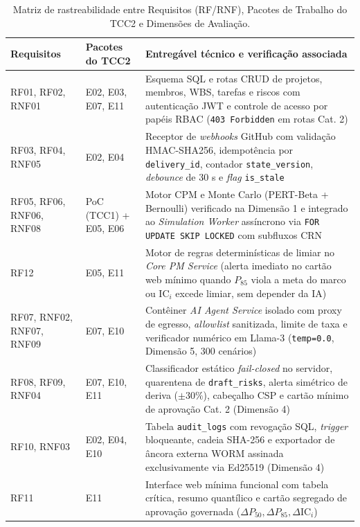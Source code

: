 \documentclass[12pt,openany,oneside,a4paper,english,brazilian,sumario=tradicional]{abntex2}
\newcommand{\fonteautores}{\par\vspace{1mm}{\small Fonte: Elaborado pelos autores (2026).}}
\newcommand{\IC}{\mathrm{IC}}
\begin{document}
\begin{table}[htbp]
\caption{Matriz de rastreabilidade entre Requisitos (RF/RNF), Pacotes de Trabalho do TCC2 e Dimensões de Avaliação.}\label{tab:rastreabilidade}
\footnotesize
\begin{tabularx}{\textwidth}{L{2.3cm} L{2.4cm} Y}
\toprule
\textbf{Requisitos} & \textbf{Pacotes do TCC2} & \textbf{Entregável técnico e verificação associada}\\
\midrule
RF01, RF02, RNF01 & E02, E03, E07, E11 & Esquema SQL e rotas CRUD de projetos, membros, WBS, tarefas e riscos com autenticação JWT e controle de acesso por papéis RBAC (\texttt{403 Forbidden} em rotas Cat. 2)\\
RF03, RF04, RNF05 & E02, E04 & Receptor de \textit{webhooks} GitHub com validação HMAC-SHA256, idempotência por \texttt{delivery\_\allowbreak id}, contador \texttt{state\_\allowbreak version}, \textit{debounce} de 30 s e \textit{flag} \texttt{is\_\allowbreak stale}\\
RF05, RF06, RNF06, RNF08 & PoC (TCC1) + E05, E06 & Motor CPM e Monte Carlo (PERT-Beta + Bernoulli) verificado na Dimensão 1 e integrado ao \textit{Simulation Worker} assíncrono via \texttt{FOR UPDATE SKIP LOCKED} com subfluxos CRN\\
RF12 & E05, E11 & Motor de regras determinísticas de limiar no \textit{Core PM Service} (alerta imediato no cartão web mínimo quando $P_{85}$ viola a meta do marco ou $\IC_i$ excede limiar, sem depender da IA)\\
RF07, RNF02, RNF07, RNF09 & E07, E10 & Contêiner \textit{AI Agent Service} isolado com proxy de egresso, \textit{allowlist} sanitizada, limite de taxa e verificador numérico em Llama-3 (\texttt{temp=0.0}, Dimensão 5, 300 cenários)\\
RF08, RF09, RNF04 & E07, E10, E11 & Classificador estático \textit{fail-closed} no servidor, quarentena de \texttt{draft\_\allowbreak risks}, alerta simétrico de deriva ($\pm 30\%$), cabeçalho CSP e cartão mínimo de aprovação Cat. 2 (Dimensão 4)\\
RF10, RNF03 & E02, E04, E10 & Tabela \texttt{audit\_\allowbreak logs} com revogação SQL, \textit{trigger} bloqueante, cadeia SHA-256 e exportador de âncora externa WORM assinada exclusivamente via Ed25519 \cite{rfc8032} (Dimensão 4)\\
RF11 & E11 & Interface web mínima funcional com tabela crítica, resumo quantílico e cartão segregado de aprovação governada ($\Delta P_{50}, \Delta P_{85}, \Delta\IC_i$)\\
\bottomrule
\end{tabularx}
\fonteautores
\end{table}
\end{document}

